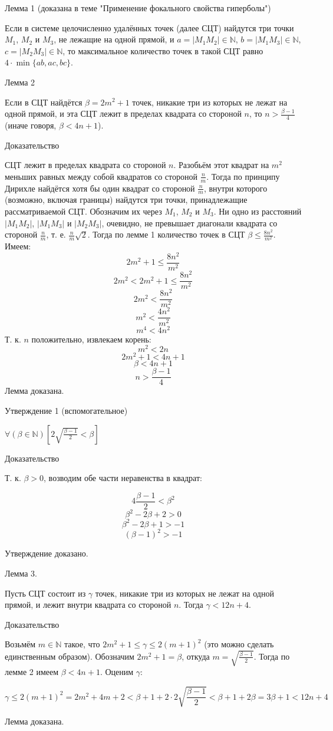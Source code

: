 \documentclass[a4paper,14pt]{article}
\begin{document}
\large

Лемма 1 (доказана в теме "Применение фокального свойства гиперболы")

Если в системе целочисленно удалённых точек (далее СЦТ) найдутся три точки
$M_1$, $M_2$ и $M_3$, не лежащие на одной прямой, и 
$a=|M_1 M_2| \in \mathbb{N}$,
$b=|M_1 M_3| \in \mathbb{N}$,
$c=|M_2 M_3| \in \mathbb{N}$,
то максимальное количество точек в такой СЦТ равно 
$4\cdot\min\{ab,ac,bc\}$.

Лемма 2

Если в СЦТ найдётся $\beta = 2m^2 +1$ точек, никакие три из которых не лежат на одной прямой, и эта СЦТ лежит в пределах квадрата со стороной $n$, то $n > \frac{\beta - 1}{4}$ (иначе говоря, $ \beta < 4n +1$).

Доказательство

СЦТ лежит в пределах квадрата со стороной $n$. Разобьём этот квадрат на $m^2$ меньших равных между собой квадратов со стороной $\frac{n}{m}$. Тогда по принципу Дирихле найдётся хотя бы один квадрат со стороной $\frac{n}{m}$, внутри которого (возможно, включая границы) найдутся три точки, принадлежащие рассматриваемой СЦТ. Обозначим их через $M_1$, $M_2$ и $M_3$. Ни одно из расстояний $|M_1 M_2|$, $|M_1 M_3|$ и $|M_2 M_3|$, очевидно, не превышает диагонали квадрата со стороной $\frac{n}{m}$, т. е. $\frac{n}{m}\sqrt{2}$. Тогда по лемме 1 количество точек в СЦТ $\beta \le \frac{8n^2}{m^2}$. Имеем:
$$ 2m^2+1 \le \frac{8n^2}{m^2}$$
$$ 2m^2 < 2m^2+1 \le \frac{8n^2}{m^2}$$
$$ 2m^2 < \frac{8n^2}{m^2}$$
$$ m^2 < \frac{4n^2}{m^2}$$
$$ m^4 < 4n^2$$
Т. к. $n$ положительно, извлекаем корень:
$$ m^2 < 2n$$
$$ 2m^2 +1 < 4n +1$$
$$ \beta < 4n +1$$
$$n > \frac{\beta - 1}{4}$$
Лемма доказана.

Утверждение 1 (вспомогательное)

$\forall \left(\beta \in \mathbb N\right)\left[  2 \sqrt{\frac{\beta - 1}{2}} < \beta \right]$

Доказательство

Т. к. $\beta >0$, возводим обе части неравенства в квадрат:

$$4 \frac{\beta - 1}{2} < \beta^2$$
$$ \beta^2-2\beta+2>0$$
$$ \beta^2-2\beta+1>-1$$
$$ (\beta-1)^2>-1$$

Утверждение доказано.

Лемма 3.

Пусть СЦТ состоит из $\gamma$ точек, никакие три из которых не лежат на одной прямой, и лежит внутри квадрата со стороной $n$. Тогда $\gamma<12n+4$.

Доказательство

Возьмём $m \in \mathbb{N}$ такое, что $2m^2+1 \le \gamma \le 2(m+1)^2$ (это можно сделать единственным образом).
Обозначим $2m^2+1=\beta$, откуда $m=\sqrt{\frac{\beta-1}{2}}$. Тогда по лемме 2 имеем $ \beta < 4n +1$. Оценим $\gamma$:

$$ \gamma \le 2(m+1)^2 = 2m^2+4m +2 < \beta + 1 + 2 \cdot 2 \sqrt{\frac{\beta-1}{2}} < 
\beta + 1 + 2 \beta = 3\beta+1<12n+4$$

Лемма доказана.
\end{document}
